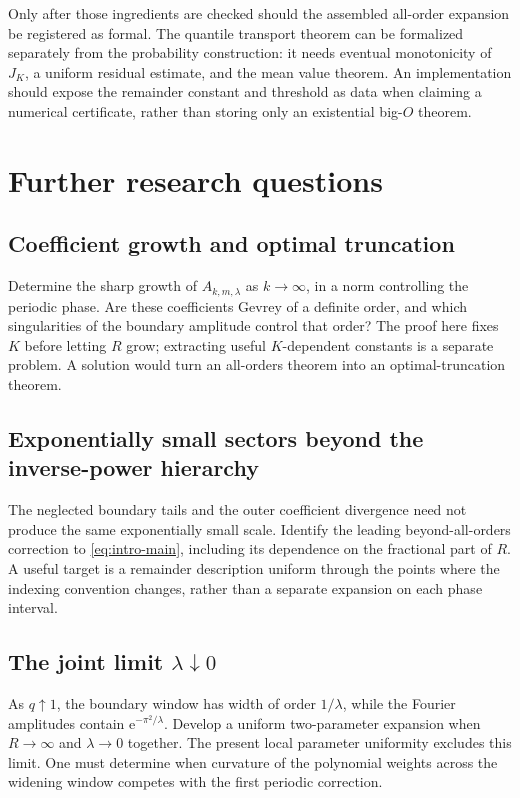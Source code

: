 \documentclass[11pt,a4paper]{article}
\numberwithin{equation}{section}
\theoremstyle{definition}
\newcommand{\ee}{\mathrm e}
\begin{document}
Only after those ingredients are checked should the assembled all-order expansion be registered as formal. The quantile transport theorem can be formalized separately from the probability construction: it needs eventual monotonicity of $J_K$, a uniform residual estimate, and the mean value theorem. An implementation should expose the remainder constant and threshold as data when claiming a numerical certificate, rather than storing only an existential big-$O$ theorem.

\section{Further research questions}
\label{sec:future}

\subsection{Coefficient growth and optimal truncation}
Determine the sharp growth of $A_{k,m,\lambda}$ as $k\to\infty$, in a norm controlling the periodic phase. Are these coefficients Gevrey of a definite order, and which singularities of the boundary amplitude control that order? The proof here fixes $K$ before letting $R$ grow; extracting useful $K$-dependent constants is a separate problem. A solution would turn an all-orders theorem into an optimal-truncation theorem.

\subsection{Exponentially small sectors beyond the inverse-power hierarchy}
The neglected boundary tails and the outer coefficient divergence need not produce the same exponentially small scale. Identify the leading beyond-all-orders correction to \eqref{eq:intro-main}, including its dependence on the fractional part of $R$. A useful target is a remainder description uniform through the points where the indexing convention changes, rather than a separate expansion on each phase interval.

\subsection{The joint limit \texorpdfstring{$\lambda\downarrow0$}{lambda tends to zero}}
As $q\uparrow1$, the boundary window has width of order $1/\lambda$, while the Fourier amplitudes contain $\ee^{-\pi^2/\lambda}$. Develop a uniform two-parameter expansion when $R\to\infty$ and $\lambda\to0$ together. The present local parameter uniformity excludes this limit. One must determine when curvature of the polynomial weights across the widening window competes with the first periodic correction.
\end{document}
